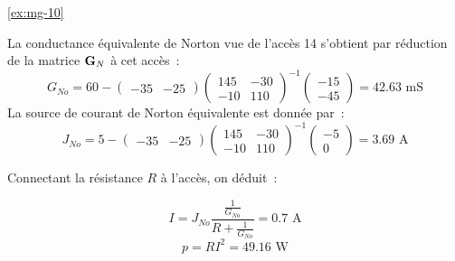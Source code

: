 \begin{solexercise}{\ref{ex:mg-10}}

La conductance équivalente de Norton vue de l'accès 14 s'obtient par
réduction de la matrice ${\bf G}_N$ à cet accès~:
\[G_{No}=60-
\begin{pmatrix}
-35 & -25
\end{pmatrix}
\begin{pmatrix}
145 & -30\\
-10 & 110
\end{pmatrix}^{-1}
\begin{pmatrix}
-15\\
-45
\end{pmatrix}= 42.63 \mbox{~mS}\]
La source de courant de Norton équivalente est donnée par~:
\[J_{No}=5-
\begin{pmatrix}
-35 & -25
\end{pmatrix}
\begin{pmatrix}
145 & -30\\
-10 & 110
\end{pmatrix}^{-1}
\begin{pmatrix}
-5\\0
\end{pmatrix}=3.69 \text{~A}\]

\pagebreak


Connectant la résistance  $R$ à l'accès, on déduit~:

\[I=J_{No}\frac{\frac{1}{G_{No}}}{R+\frac{1}{G_{No}}}=0.7 \text{~A}\]
\[p=RI^2=49.16 \text{~W}\]
\end{solexercise}

